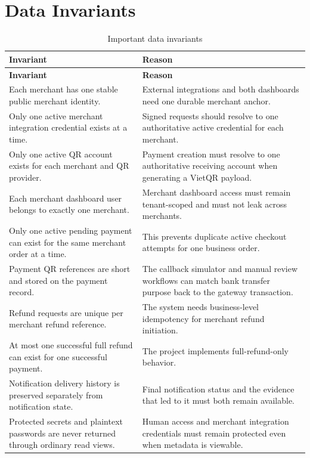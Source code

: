 \section{Data Invariants}

\begin{longtable}{L{0.34\textwidth}L{0.56\textwidth}}
\caption{Important data invariants}\\
\toprule
\textbf{Invariant} & \textbf{Reason} \\
\midrule
\endfirsthead
\toprule
\textbf{Invariant} & \textbf{Reason} \\
\midrule
\endhead
Each merchant has one stable public merchant identity. & External integrations and both dashboards need one durable merchant anchor. \\
\bodyrowrule
Only one active merchant integration credential exists at a time. & Signed requests should resolve to one authoritative active credential for each merchant. \\
\bodyrowrule
Only one active QR account exists for each merchant and QR provider. & Payment creation must resolve to one authoritative receiving account when generating a VietQR payload. \\
\bodyrowrule
Each merchant dashboard user belongs to exactly one merchant. & Merchant dashboard access must remain tenant-scoped and must not leak across merchants. \\
\bodyrowrule
Only one active pending payment can exist for the same merchant order at a time. & This prevents duplicate active checkout attempts for one business order. \\
\bodyrowrule
Payment QR references are short and stored on the payment record. & The callback simulator and manual review workflows can match bank transfer purpose back to the gateway transaction. \\
\bodyrowrule
Refund requests are unique per merchant refund reference. & The system needs business-level idempotency for merchant refund initiation. \\
\bodyrowrule
At most one successful full refund can exist for one successful payment. & The project implements full-refund-only behavior. \\
\bodyrowrule
Notification delivery history is preserved separately from notification state. & Final notification status and the evidence that led to it must both remain available. \\
\bodyrowrule
Protected secrets and plaintext passwords are never returned through ordinary read views. & Human access and merchant integration credentials must remain protected even when metadata is viewable. \\
\bottomrule
\end{longtable}

